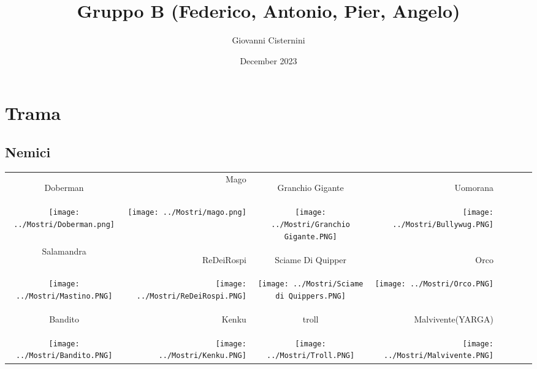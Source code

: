 \documentclass{article}
\title{Gruppo B (Federico, Antonio, Pier, Angelo)}
\author{Giovanni Cisternini}
\date{December 2023}
\begin{document}
\tableofcontents

\maketitle


\section{Trama}
        \subsection{Nemici}
\begin{table}
    \centering
    \begin{tabular}{|cr|cr|cr|cr|}
        \hline
        \hypertarget{doberman}{Doberman} & Mago & \hypertarget{granchio}{Granchio Gigante} & \hypertarget{uomorana}{Uomorana}\\
        \texttt{[image: ../Mostri/Doberman.png]} &  \texttt{[image: ../Mostri/mago.png]} &\texttt{[image: ../Mostri/Granchio Gigante.PNG]} &  \texttt{[image: ../Mostri/Bullywug.PNG]} \\
        \hline
        Salamandra & \hypertarget{re}{ReDeiRospi} &  \hypertarget{sciame}{Sciame Di Quipper} & \hypertarget{orco}{Orco}\\
        \texttt{[image: ../Mostri/Mastino.PNG]} & \texttt{[image: ../Mostri/ReDeiRospi.PNG]} &  \texttt{[image: ../Mostri/Sciame di Quippers.PNG]} & \texttt{[image: ../Mostri/Orco.PNG]}\\
        \hline 
        \hypertarget{bandito}{Bandito} & \hypertarget{kenk}{Kenku} &  \hypertarget{troll}{troll} &  \hypertarget{malvivente}{Malvivente(YARGA)}\\
        \texttt{[image: ../Mostri/Bandito.PNG]} & \texttt{[image: ../Mostri/Kenku.PNG]} & \texttt{[image: ../Mostri/Troll.PNG]} & \texttt{[image: ../Mostri/Malvivente.PNG]}
        
    \end{tabular}
\end{table}
\end{document}
